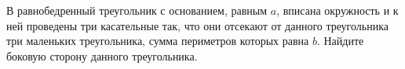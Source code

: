 \begin{ex}
	\begin{condition}
		В равнобедренный треугольник с основанием, равным \( a \), вписана окружность и к ней проведены три касательные так, что они отсекают от данного треугольника три маленьких	треугольника, сумма периметров которых равна \( b \). Найдите боковую сторону данного треугольника.
	\end{condition}
\end{ex}
